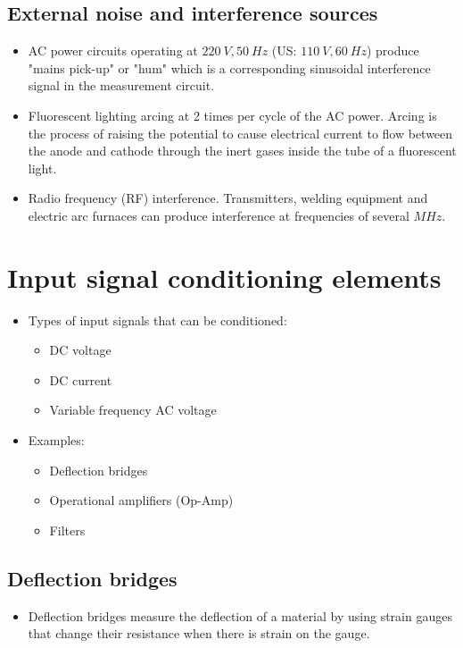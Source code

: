\documentclass[11pt]{article}
\begin{document}
\subsection{External noise and interference sources}
\label{sec:org8b83796}
\begin{itemize}
\item AC power circuits operating at \(\qty{220}{V}, \qty{50}{Hz}\) (US: \(\qty{110}{V}, \qty{60}{Hz}\)) produce "mains pick-up" or "hum" which is a corresponding sinusoidal interference signal in the measurement circuit.
\item Fluorescent lighting arcing at 2 times per cycle of the AC power. Arcing is the process of raising the potential to cause electrical current to flow between the anode and cathode through the inert gases inside the tube of a fluorescent light.
\item Radio frequency (RF) interference. Transmitters, welding equipment and electric arc furnaces can produce interference at frequencies of several \(\unit{MHz}\).
\end{itemize}

\section{Input signal conditioning elements}
\label{sec:orgdf152dc}
\begin{itemize}
\item Types of input signals that can be conditioned:
\begin{itemize}
\item DC voltage
\item DC current
\item Variable frequency AC voltage
\end{itemize}
\item Examples:
\begin{itemize}
\item Deflection bridges
\item Operational amplifiers (Op-Amp)
\item Filters
\end{itemize}
\end{itemize}

\subsection{Deflection bridges}
\label{sec:org11a45ad}
\begin{itemize}
\item Deflection bridges measure the deflection of a material by using strain gauges that change their resistance when there is strain on the gauge.
\end{itemize}
\end{document}
